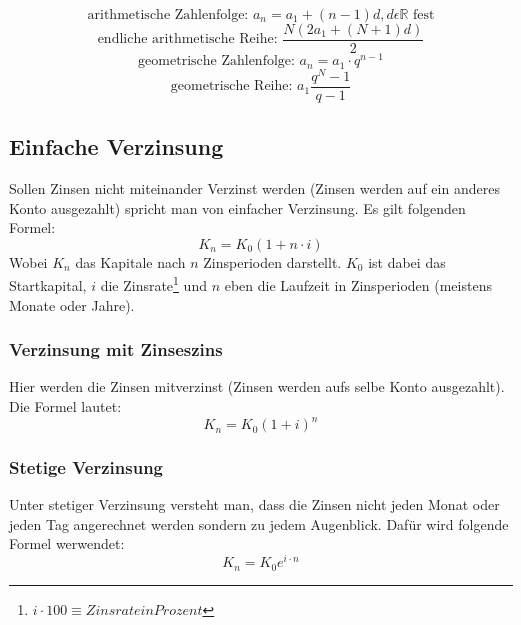 \documentclass[a4paper]{scrartcl}
\begin{document}
        \begin{equation*}
            \text{arithmetische Zahlenfolge: } a_n = a_1 + (n - 1)d, d \epsilon \mathbb{R} \text{ fest} 
        \end{equation*}
        \begin{equation*}
            \text{endliche arithmetische Reihe: } \frac{N(2a_1+(N+1)d)}{2}
        \end{equation*}
        \begin{equation*}
            \text{geometrische Zahlenfolge: } a_n = a_1 \cdot q^{n-1}
        \end{equation*}
        \begin{equation*}
            \text{geometrische Reihe: } a_1 \frac{q^N - 1}{q - 1}
        \end{equation*}

        \subsection{Einfache Verzinsung}
        Sollen Zinsen nicht miteinander Verzinst werden (Zinsen werden auf ein anderes Konto ausgezahlt) spricht man von einfacher Verzinsung. Es gilt folgenden Formel:
        \begin{equation*}
            K_n = K_0(1 + n \cdot i)
        \end{equation*}
        Wobei \(K_n\) das Kapitale nach \(n\) Zinsperioden darstellt. \(K_0\) ist dabei das Startkapital, \(i\) die Zinsrate\footnote{\(i \cdot 100 \equiv Zinsrate in Prozent\)} und \(n\)
        eben die Laufzeit in Zinsperioden (meistens Monate oder Jahre).
            \subsubsection{Verzinsung mit Zinseszins}
            Hier werden die Zinsen mitverzinst (Zinsen werden aufs selbe Konto ausgezahlt). Die Formel lautet: 
            \begin{equation*}
                K_n = K_0(1+i)^n
            \end{equation*} 

            \subsubsection{Stetige Verzinsung}
            Unter stetiger Verzinsung versteht man, dass die Zinsen nicht jeden Monat oder jeden Tag angerechnet werden sondern zu jedem Augenblick. Dafür wird folgende Formel werwendet: 
            \begin{equation*}
                K_n = K_0 e^{i \cdot n}
            \end{equation*}
\end{document}
